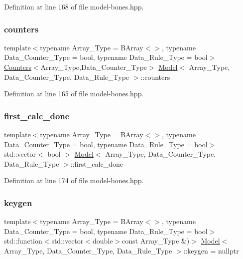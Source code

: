 Definition at line 168 of file model-\/bones.\+hpp.

\mbox{\label{class_model_a3189eb46eed19f865ca0aa3f6b191c78}} 
\subsubsection{\texorpdfstring{counters}{counters}}
{\footnotesize\ttfamily template$<$typename Array\+\_\+\+Type = B\+Array$<$$>$, typename Data\+\_\+\+Counter\+\_\+\+Type = bool, typename Data\+\_\+\+Rule\+\_\+\+Type = bool$>$ \\
\hyperlink{class_counters}{Counters}$<$Array\+\_\+\+Type,Data\+\_\+\+Counter\+\_\+\+Type$>$ \hyperlink{class_model}{Model}$<$ Array\+\_\+\+Type, Data\+\_\+\+Counter\+\_\+\+Type, Data\+\_\+\+Rule\+\_\+\+Type $>$\+::counters}



Definition at line 165 of file model-\/bones.\+hpp.

\mbox{\label{class_model_a942b2cdb7472878fa17c5068680441c6}} 
\subsubsection{\texorpdfstring{first\+\_\+calc\+\_\+done}{first\_calc\_done}}
{\footnotesize\ttfamily template$<$typename Array\+\_\+\+Type = B\+Array$<$$>$, typename Data\+\_\+\+Counter\+\_\+\+Type = bool, typename Data\+\_\+\+Rule\+\_\+\+Type = bool$>$ \\
std\+::vector$<$ bool $>$ \hyperlink{class_model}{Model}$<$ Array\+\_\+\+Type, Data\+\_\+\+Counter\+\_\+\+Type, Data\+\_\+\+Rule\+\_\+\+Type $>$\+::first\+\_\+calc\+\_\+done}



Definition at line 174 of file model-\/bones.\+hpp.

\mbox{\label{class_model_a16561e15c0abbb080927382b30d43e35}} 
\subsubsection{\texorpdfstring{keygen}{keygen}}
{\footnotesize\ttfamily template$<$typename Array\+\_\+\+Type = B\+Array$<$$>$, typename Data\+\_\+\+Counter\+\_\+\+Type = bool, typename Data\+\_\+\+Rule\+\_\+\+Type = bool$>$ \\
std\+::function$<$std\+::vector$<$double$>$const Array\+\_\+\+Type \&)$>$ \hyperlink{class_model}{Model}$<$ Array\+\_\+\+Type, Data\+\_\+\+Counter\+\_\+\+Type, Data\+\_\+\+Rule\+\_\+\+Type $>$\+::keygen = nullptr}



